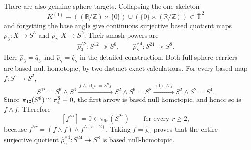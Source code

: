\documentclass[10pt,letterpaper]{article}
\begin{document}
There are also genuine sphere targets.  Collapsing the one-skeleton
\[
 K^{(1)}=((\mathbb R/\mathbb Z)\times\{0\})
 \cup(\{0\}\times(\mathbb R/\mathbb Z))
 \subset\overline{\mathbb T}^{\,2}
\]
and forgetting the base angle give continuous surjective based quotient
maps $\widehat\rho_3:X\to S^3$ and
$\widehat\rho_\gamma:X\to S^2$.  Their smash powers are
\[
 \widehat\rho_3^{\wedge2}:S^{12}\twoheadrightarrow S^6,
 \qquad
 \widehat\rho_\gamma^{\wedge4}:S^{24}\twoheadrightarrow S^8.
\]
Here \(\widehat\rho_3=\widehat q_3\) and
\(\widehat\rho_\gamma=\widehat q_\gamma\) in the detailed construction.
Both full sphere carriers are based null-homotopic, by two distinct exact
calculations.  For every based map \(f:S^6\to S^2\),
\[
 S^{12}=S^6\wedge S^6
 \xrightarrow{\ f\wedge\operatorname{id}_{S^6}=\Sigma^6f\ }
 S^2\wedge S^6=S^8
 \xrightarrow{\ \operatorname{id}_{S^2}\wedge f\ }
 S^2\wedge S^2=S^4.
\]
Since
\(\pi_{12}(S^8)\cong\pi_4^{\rm S}=0\), the first arrow is based
null-homotopic, and hence so is \(f\wedge f\).  Therefore
\[
 [f^{\wedge r}]=0\in\pi_{6r}(S^{2r})
 \qquad\text{for every }r\ge2,
\]
because
\(f^{\wedge r}=(f\wedge f)\wedge f^{\wedge(r-2)}\).  Taking
\(f=\widehat\rho_\gamma\) proves that the entire surjective quotient
\(\widehat\rho_\gamma^{\wedge4}:S^{24}\twoheadrightarrow S^8\) is based
null-homotopic.
\end{document}
